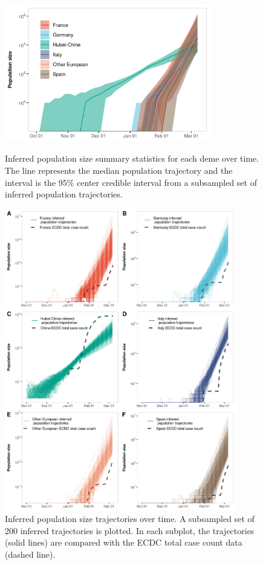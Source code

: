 \documentclass[12pt,]{article}
\begin{document}

\begin{figure}[]
    \centering
    \includegraphics[width=0.8\textwidth]{201030_europe3_figtraj01.png}
    \caption{Inferred population size summary statistics for each deme over time. The line represents the median population trajectory and the interval is the 95\% center credible interval from a subsampled set of inferred population trajectories.}{}
    \label{fig:gribbon}
\end{figure}


\begin{figure}[]
    \centering
    \includegraphics[width=0.9\textwidth]{201030_europe3_figtraj02.png}
    \caption{Inferred population size trajectories over time. A subsampled set of 200 inferred trajectories is plotted. In each subplot, the trajectories (solid lines) are compared with the ECDC total case count data (dashed line).}
    \label{fig:trajs}
\end{figure}
\end{document}
